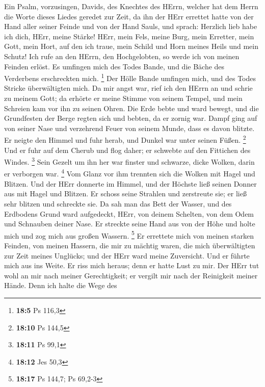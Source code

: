  Ein Psalm, vorzusingen, Davids, des Knechtes des HErrn,
welcher hat dem Herrn die Worte dieses Liedes geredet zur Zeit, da ihn
der HErr errettet hatte von der Hand aller seiner Feinde und von der
Hand Sauls,  und sprach: Herzlich lieb habe ich dich,
HErr, meine Stärke!  HErr, mein Fels, meine Burg, mein
Erretter, mein Gott, mein Hort, auf den ich traue, mein Schild und Horn
meines Heils und mein Schutz!  Ich rufe an den HErrn, den
Hochgelobten, so werde ich von meinen Feinden erlöst.  Es
umfingen mich des Todes Bande, und die Bäche des Verderbens erschreckten
mich. \footnote{\textbf{18:5} Ps 116,3}  Der Hölle Bande
umfingen mich, und des Todes Stricke überwältigten mich. 
Da mir angst war, rief ich den HErrn an und schrie zu meinem Gott; da
erhörte er meine Stimme von seinem Tempel, und mein Schreien kam vor ihn
zu seinen Ohren.  Die Erde bebte und ward bewegt, und die
Grundfesten der Berge regten sich und bebten, da er zornig war.
 Dampf ging auf von seiner Nase und verzehrend Feuer von
seinem Munde, dass es davon blitzte.  Er neigte den
Himmel und fuhr herab, und Dunkel war unter seinen Füßen. \footnote{\textbf{18:10}
  Ps 144,5}  Und er fuhr auf dem Cherub und flog daher;
er schwebte auf den Fittichen des Windes. \footnote{\textbf{18:11} Ps
  99,1}  Sein Gezelt um ihn her war finster und schwarze,
dicke Wolken, darin er verborgen war. \footnote{\textbf{18:12} Jes 50,3}
 Vom Glanz vor ihm trennten sich die Wolken mit Hagel und
Blitzen.  Und der HErr donnerte im Himmel, und der
Höchste ließ seinen Donner aus mit Hagel und Blitzen.  Er
schoss seine Strahlen und zerstreute sie; er ließ sehr blitzen und
schreckte sie.  Da sah man das Bett der Wasser, und des
Erdbodens Grund ward aufgedeckt, HErr, von deinem Schelten, von dem Odem
und Schnauben deiner Nase.  Er streckte seine Hand aus
von der Höhe und holte mich und zog mich aus großen Wassern. \footnote{\textbf{18:17}
  Ps 144,7; Ps 69,2-3}  Er errettete mich von meinen
starken Feinden, von meinen Hassern, die mir zu mächtig waren,
 die mich überwältigten zur Zeit meines Unglücks; und der
HErr ward meine Zuversicht.  Und er führte mich aus ins
Weite. Er riss mich heraus; denn er hatte Lust zu mir. 
Der HErr tut wohl an mir nach meiner Gerechtigkeit; er vergilt mir nach
der Reinigkeit meiner Hände.  Denn ich halte die Wege des
